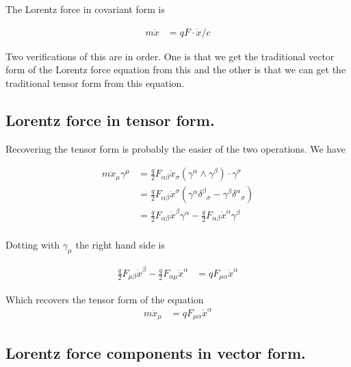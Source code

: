 \documentclass{article}
\begin{document}
The Lorentz force in covariant form is

%

\begin{align}
m \ddot{x} &= q F \cdot \dot{x}/c
\end{align}

Two verifications of this are in order.  One is that we get the traditional vector form of the Lorentz force equation from
this and the other is that we can get the traditional tensor form from this equation.

\subsection{ Lorentz force in tensor form. }

Recovering the tensor form is probably the easier of the two operations.  We have

\begin{align*}
m \ddot{x}_\mu \gamma^\mu
&= \frac{q}{2} F_{\alpha\beta} \dot{x}_\sigma (\gamma^{\alpha} \wedge \gamma^\beta) \cdot \gamma^\sigma \\
&= \frac{q}{2} F_{\alpha\beta} \dot{x}^\sigma (\gamma^{\alpha} {\delta^\beta}_\sigma -\gamma^{\beta} {\delta^\alpha}_\sigma ) \\
&= \frac{q}{2} F_{\alpha\beta} \dot{x}^\beta \gamma^{\alpha} - \frac{q}{2} F_{\alpha\beta} \dot{x}^\alpha \gamma^{\beta} \\
\end{align*}

Dotting with $\gamma_\mu$ the right hand side is

\begin{align*}
\frac{q}{2} F_{\mu\beta} \dot{x}^\beta - \frac{q}{2} F_{\alpha\mu} \dot{x}^\alpha 
&= {q} F_{\mu\alpha} \dot{x}^\alpha 
\end{align*}

Which recovers the tensor form of the equation
\begin{align}
m \ddot{x}_\mu &= {q} F_{\mu\alpha} \dot{x}^\alpha 
\end{align}

\subsection{ Lorentz force components in vector form. }
\end{document}
